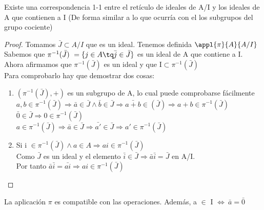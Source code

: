 \documentclass[nochap]{apuntes}
\begin{document}
\begin{lemma}
 Existe una correspondencia 1-1 entre el retículo de ideales de A/I y los ideales de A que contienen a I (De forma similar a lo que ocurría
 con el los subgrupos del grupo cociente)
\end{lemma}
\begin{proof}
 Tomamos $\bar{J}\subset A/I$  que es un ideal. Tenemos definida $\appl{\pi}{A}{A/I}$\\
 Sabemos que $\pi^{-1}(\bar{J})\  =\{j \in A \tq \bar{j} \in \bar{J}\}$  es un ideal de A que contiene a I.\\
 Ahora afirmamos que $\pi^{-1}(\bar{J})$  es un ideal y que I$\subset \pi^{-1}(\bar{J})$\\
 Para comprobarlo hay que demostrar dos cosas:
 \begin{enumerate}
  \item $(\pi^{-1}(\bar{J}), + )$  es un subgrupo de A, lo cual puede comprobarse fácilmente\\
  $a,b \in \pi^{-1}(\bar{J}) \Rightarrow \bar{a}\in \bar{J} \wedge \bar{b}\in\bar{J}  \Rightarrow  \bar{a+b} \in(\bar{J}) \Rightarrow a+b \in \pi^{-1}(\bar{J})$\\
  $\bar{0} \in \bar{J} \Rightarrow 0 \in \pi^{-1}(\bar{J})$\\
  $a \in \pi^{-1}(\bar{J}) \Rightarrow \bar{a} \in \bar{J} \Rightarrow \bar{a'}\in \bar{J} \Rightarrow a' \in \pi^{-1}(\bar{J})$\\
  \item Si i $\in\pi^{-1}(\bar{J}) \wedge a \in A \Rightarrow ai\in \pi^{-1}(\bar{J})$\\
  Como $\bar{J}$  es un ideal y el elemento $\bar{i}\in\bar{J} \Rightarrow \bar{a}\bar{i}=\bar{J}$  en A/I.\\
  Por tanto $\bar{a}\bar{i}=\bar{ai} \Rightarrow  ai \in \pi^{-1}(\bar{J})$\\
  \end{enumerate}
\end{proof}

\obs La aplicación $\pi$  es compatible con las operaciones. Además, a $\in$ I $\Leftrightarrow \ \bar{a}=\bar{0}$
\end{document}
